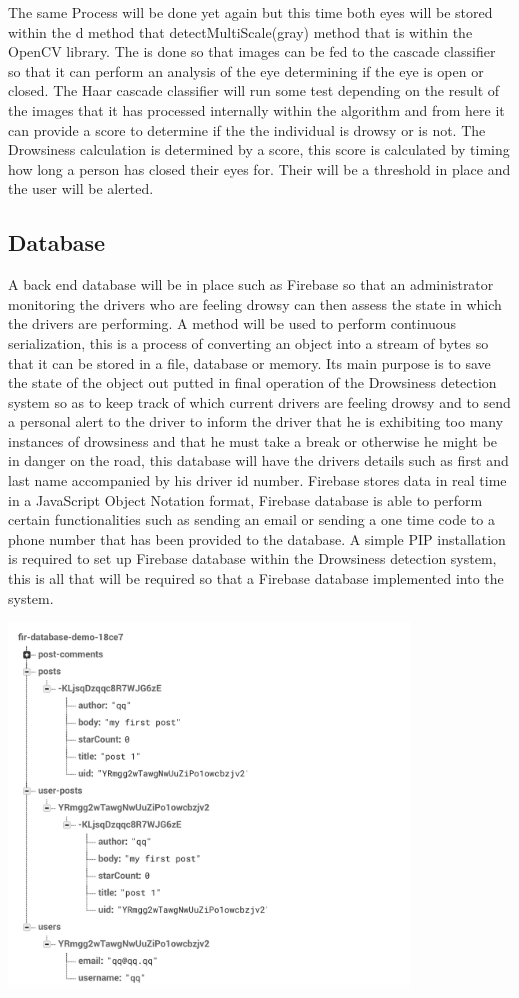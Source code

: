 The same Process will be done yet again but this time both eyes will be stored within the d method that detectMultiScale(gray) method that is within the OpenCV library. The is done so that images can be fed to the cascade classifier so that it can perform an analysis of the eye determining if the eye is open or closed. The Haar cascade classifier will run some test depending on the result of the images that it has processed internally within the algorithm and from here it can provide a score to determine if the the individual is drowsy or is not. The Drowsiness calculation is determined by a score, this score is calculated by timing how long a person has closed their eyes for. Their will be a threshold in place and the user will be alerted. 
\subsection{Database}
A back end database will be in place such as Firebase so that an administrator monitoring the drivers who are feeling drowsy can then assess the state in which the drivers are performing. A method will be used to perform continuous serialization, this is a process of converting an object into a stream of bytes so that it can be stored in a file, database or memory. Its main purpose is to save the state of the object out putted in final operation of the Drowsiness detection system so as to keep track of which current drivers are feeling drowsy and to send a personal alert to the driver to inform the driver that he is exhibiting too many instances of drowsiness and that he must take a break or otherwise he might be in danger on the road, this database will have the drivers details such as first and last name accompanied by his driver id number. Firebase stores data in real time in a JavaScript Object Notation format, Firebase database is able to perform certain functionalities such as sending an email or sending a one time code to a phone number that has been provided to the database. A simple PIP installation is required to set up Firebase database within the Drowsiness detection system, this is all that will be required so that a Firebase database implemented into the system.

\includegraphics[width=0.8\textwidth]{Figures/Firebase.png}

